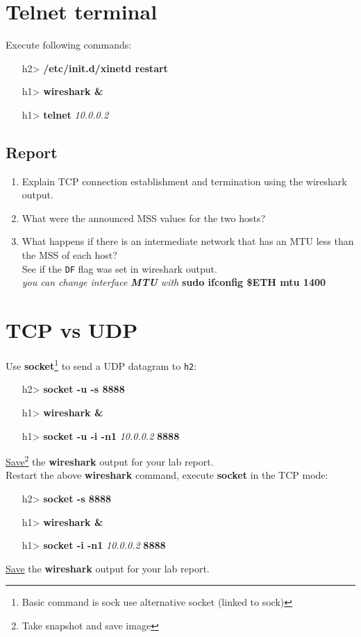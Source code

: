 \documentclass[10pt,a4paper]{article}
\numberwithin{equation}{section}
\numberwithin{figure}{section}
\numberwithin{table}{section}
\begin{document}
\section*{Telnet terminal}
	Execute following commands: \\
	\begin{itemize}
		\item [h2>] \textbf{/etc/init.d/xinetd restart}
		\item [h1>] \textbf{wireshark \&}
		\item [h1>] \textbf{telnet} \textit{10.0.0.2}
	\end{itemize}
	\subsection*{Report}
	\begin{enumerate}
		\item Explain TCP connection establishment and termination using the wireshark output.
		\item What were the announced MSS values for the two hosts? \\
		\item What happens if there is an intermediate network that has an MTU less than the MSS of each host? \\
		See if the \texttt{DF} flag was set in wireshark output.\\
		\textit{you can change interface \textbf{MTU} with} \textbf{sudo ifconfig \$ETH mtu 1400}
	\end{enumerate}
    

\section*{TCP vs UDP}
	Use \textbf{socket}\footnote{Basic command is sock use alternative socket (linked to sock)} to send a UDP datagram to \texttt{h2}: \\
	\begin{itemize}
		\item [h2>] \textbf{socket -u -s 8888}
		\item [h1>] \textbf{wireshark \&}
		\item [h1>] \textbf{socket -u -i -n1} \textit{10.0.0.2} \textbf{8888}
	\end{itemize}
    \underline{Save}\footnote{Take snapshot and save image} the \textbf{wireshark} output for your lab report. \\
	Restart the above \textbf{wireshark} command, execute \textbf{socket} in the TCP mode: \\
	\begin{itemize}
		\item [h2>] \textbf{socket -s 8888}
		\item [h1>] \textbf{wireshark \&} \\
		\item [h1>] \textbf{socket -i -n1} \textit{10.0.0.2} \textbf{8888} \\
	\end{itemize}
    \underline{Save} the \textbf{wireshark} output for your lab report.
\end{document}
